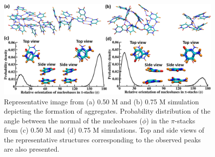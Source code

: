 \begin{figure}
    \centering
    \includegraphics{Chapter2/Figures/Figure4.png}
    \caption[Representative structures depicting various aggregates formed in 0.50 and 0.75M simulations are presented. Probability distribution of the angle between the normal of the nucleobases ($\phi$) in the $\pi$-stacks are also presented]{Representative image from (a) 0.50 M and (b) 0.75 M simulation depicting the formation of aggregates. Probability distribution of the angle between the normal of the nucleobases ($\phi$) in the $\pi$-stacks from (c) 0.50 M and (d) 0.75 M simulations. Top and side views of the representative structures corresponding to the observed peaks are also presented.}
\end{figure}

